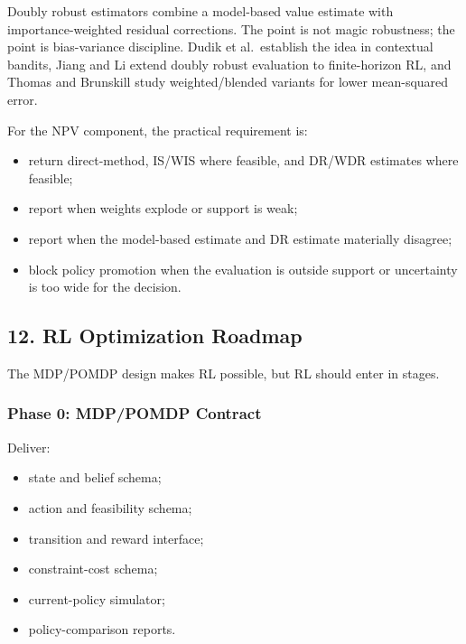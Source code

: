 \documentclass[
]{article}
\providecommand{\tightlist}{%
  \setlength{\itemsep}{0pt}\setlength{\parskip}{0pt}}
\begin{document}
Doubly robust estimators combine a model-based value estimate with
importance-weighted residual corrections. The point is not magic
robustness; the point is bias-variance discipline. Dudik et
al.~establish the idea in contextual bandits, Jiang and Li extend doubly
robust evaluation to finite-horizon RL, and Thomas and Brunskill study
weighted/blended variants for lower mean-squared error.

For the NPV component, the practical requirement is:

\begin{itemize}
\tightlist
\item
  return direct-method, IS/WIS where feasible, and DR/WDR estimates
  where feasible;
\item
  report when weights explode or support is weak;
\item
  report when the model-based estimate and DR estimate materially
  disagree;
\item
  block policy promotion when the evaluation is outside support or
  uncertainty is too wide for the decision.
\end{itemize}

\hypertarget{rl-optimization-roadmap}{%
\subsection{12. RL Optimization Roadmap}\label{rl-optimization-roadmap}}

The MDP/POMDP design makes RL possible, but RL should enter in stages.

\hypertarget{phase-0-mdppomdp-contract}{%
\subsubsection{Phase 0: MDP/POMDP
Contract}\label{phase-0-mdppomdp-contract}}

Deliver:

\begin{itemize}
\tightlist
\item
  state and belief schema;
\item
  action and feasibility schema;
\item
  transition and reward interface;
\item
  constraint-cost schema;
\item
  current-policy simulator;
\item
  policy-comparison reports.
\end{itemize}
\end{document}
